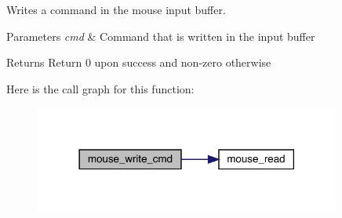 Writes a command in the mouse input buffer. 


\begin{DoxyParams}{Parameters}
{\em cmd} & Command that is written in the input buffer\\
\hline
\end{DoxyParams}
\begin{DoxyReturn}{Returns}
Return 0 upon success and non-\/zero otherwise 
\end{DoxyReturn}
Here is the call graph for this function\+:\nopagebreak
\begin{figure}[H]
\begin{center}
\leavevmode
\includegraphics[width=285pt]{group__mouse_gad26aa3828c4a6d900e654de8e4e68e83_cgraph}
\end{center}
\end{figure}
